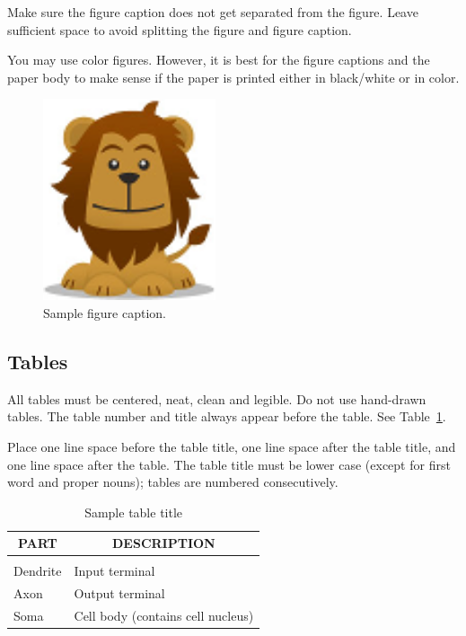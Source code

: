 \documentclass{article} %
\begin{document}
Make sure the figure caption does not get separated from the figure.
Leave sufficient space to avoid splitting the figure and figure caption.

You may use color figures. 
However, it is best for the
figure captions and the paper body to make sense if the paper is printed
either in black/white or in color.
\begin{figure}[h]
\begin{center}
\includegraphics[width=2in]{logo.png}
\end{center}
\caption{Sample figure caption.}
\end{figure}

\subsection{Tables}

All tables must be centered, neat, clean and legible. Do not use hand-drawn
tables. The table number and title always appear before the table. See
Table~\ref{sample-table}.

Place one line space before the table title, one line space after the table
title, and one line space after the table. The table title must be lower case
(except for first word and proper nouns); tables are numbered consecutively.

\begin{table}[t]
\caption{Sample table title}
\label{sample-table}
\begin{center}
\begin{tabular}{ll}
\multicolumn{1}{c}{\bf PART}  &\multicolumn{1}{c}{\bf DESCRIPTION}
\\ \hline \\
Dendrite         &Input terminal \\
Axon             &Output terminal \\
Soma             &Cell body (contains cell nucleus) \\
\end{tabular}
\end{center}
\end{table}
\end{document}
